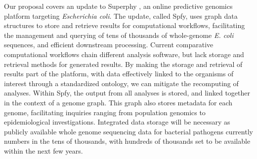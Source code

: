 \documentclass[a4,center,fleqn]{NAR}
\begin{document}
Our proposal covers an update to Superphy \cite{whiteside2016superphy}, an online predictive genomics platform targeting \textit{Escherichia coli}.
The update, called Spfy, uses graph data structures to store and retrieve results for computational workflows, facilitating the management and querying of tens of thousands of whole-genome \textit{E. coli} sequences, and efficient downstream processing.
Current comparative computational workflows chain different analysis software, but lack storage and retrieval methods for generated results.
By making the storage and retrieval of results part of the platform, with data effectively linked to the organisms of interest through a standardized ontology, we can mitigate the recomputing of analyses.
Within Spfy, the output from all analyses is stored, and linked together in the context of a genome graph. This graph also stores metadata for each genome, facilitating inquiries ranging from population genomics to epidemiological investigations.
Integrated data storage will be necessary as publicly available whole genome sequencing data for bacterial pathogens currently numbers in the tens of thousands, with hundreds of thousands set to be available within the next few years. \par
\end{document}
